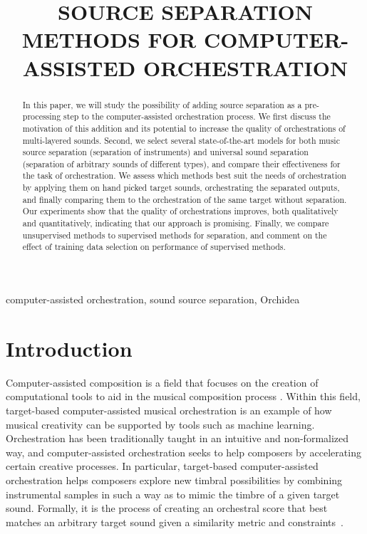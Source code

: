 \documentclass{article}
\title{SOURCE SEPARATION METHODS FOR COMPUTER-ASSISTED ORCHESTRATION}
\begin{document}

\maketitle

\begin{abstract}
  In this paper, we will study the possibility of adding source separation as a pre-processing step to the computer-assisted orchestration process. We first discuss the motivation of this addition and its potential to increase the quality of orchestrations of multi-layered sounds. Second, we select several state-of-the-art models for both music source separation (separation of instruments) and universal sound separation (separation of arbitrary sounds of different types), and compare their effectiveness for the task of orchestration. We assess which methods best suit the needs of orchestration by applying them on hand picked target sounds, orchestrating the separated outputs, and finally comparing them to the orchestration of the same target without separation. Our experiments show that the quality of orchestrations improves, both qualitatively and quantitatively, indicating that our approach is promising. Finally, we compare unsupervised methods to supervised methods for separation, and comment on the effect of training data selection on performance of supervised methods.
\end{abstract}
%
\begin{keywords}
computer-assisted orchestration, sound source separation, Orchidea
\end{keywords}
%
\section{Introduction}\label{sec:introduction}
  Computer-assisted composition is a field that focuses on the creation of computational tools to aid in the musical composition process \cite{FerVic2013, Ari2005}. Within this field, target-based computer-assisted musical orchestration is an example of how musical creativity can be supported by tools such as machine learning. Orchestration has been traditionally taught in an intuitive and non-formalized way, and computer-assisted orchestration seeks to help composers by accelerating certain creative processes. In particular, target-based computer-assisted orchestration helps composers explore new timbral possibilities by combining instrumental samples in such a way as to mimic the timbre of a given target sound. Formally, it is the process of creating an orchestral score that best matches an arbitrary target sound given a similarity metric and constraints~\cite{Maresz2003}.
  
\end{document}
